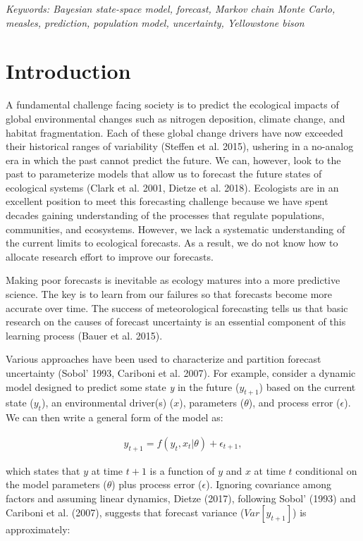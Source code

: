 \documentclass[12pt,]{article}
\begin{document}
\emph{Keywords: Bayesian state-space model, forecast, Markov chain Monte
Carlo, measles, prediction, population model, uncertainty, Yellowstone
bison}

\hypertarget{introduction}{%
\section{Introduction}\label{introduction}}

A fundamental challenge facing society is to predict the ecological
impacts of global environmental changes such as nitrogen deposition,
climate change, and habitat fragmentation. Each of these global change
drivers have now exceeded their historical ranges of variability
(Steffen et al. 2015), ushering in a no-analog era in which the past
cannot predict the future. We can, however, look to the past to
parameterize models that allow us to forecast the future states of
ecological systems (Clark et al. 2001, Dietze et al. 2018). Ecologists
are in an excellent position to meet this forecasting challenge because
we have spent decades gaining understanding of the processes that
regulate populations, communities, and ecosystems. However, we lack a
systematic understanding of the current limits to ecological forecasts.
As a result, we do not know how to allocate research effort to improve
our forecasts.

Making poor forecasts is inevitable as ecology matures into a more
predictive science. The key is to learn from our failures so that
forecasts become more accurate over time. The success of meteorological
forecasting tells us that basic research on the causes of forecast
uncertainty is an essential component of this learning process (Bauer et
al. 2015).

Various approaches have been used to characterize and partition forecast
uncertainty (Sobol' 1993, Cariboni et al. 2007). For example, consider a
dynamic model designed to predict some state \emph{y} in the future
(\(y_{t+1}\)) based on the current state (\(y_{t}\)), an environmental
driver(s) (\(x\)), parameters (\(\theta\)), and process error
(\(\epsilon\)). We can then write a general form of the model as:

\begin{align}
y_{t+1} = f(y_t, x_t|\theta) + \epsilon_{t+1},
\end{align}

\noindent{}which states that \(y\) at time \(t+1\) is a function of
\(y\) and \(x\) at time \(t\) conditional on the model parameters
(\(\theta\)) plus process error (\(\epsilon\)). Ignoring covariance
among factors and assuming linear dynamics, Dietze (2017), following
Sobol' (1993) and Cariboni et al. (2007), suggests that forecast
variance (\(Var[y_{t+1}]\)) is approximately:
\end{document}
